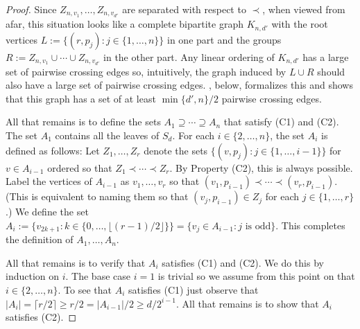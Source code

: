 \documentclass[kpfonts]{patmorin}
\renewcommand{\ge}{\geqslant}
\begin{document}
\begin{proof}
    Since $Z_{n,v_1},\ldots,Z_{n,v_{d'}}$ are separated with respect to $\prec$, when viewed from afar, this situation looks like a complete bipartite graph $K_{n,d'}$ with the root vertices $L:=\{(r,p_j):j\in\{1,\ldots,n\}\}$ in one part and the groups $R:=Z_{n,v_1}\cup\cdots\cup Z_{n,v_{d'}}$ in the other part.  Any linear ordering of $K_{n,d'}$ has a large set of pairwise crossing edges so, intuitively, the graph induced by $L\cup R$ should also have a large set of pairwise crossing edges. , below, formalizes this and shows that this graph has a set of at least $\min\{d',n\}/2$ pairwise crossing edges.

    All that remains is to define the sets $A_1\supseteq\cdots\supseteq A_n$ that satisfy (C1) and (C2).  The set $A_1$ contains all the leaves of $S_d$.  For each $i\in\{2,\ldots,n\}$, the set $A_i$ is defined as follows:  Let $Z_1,\ldots,Z_r$ denote the sets $\{(v,p_j):j\in\{1,\ldots,i-1\}\}$ for $v\in A_{i-1}$ ordered so that $Z_1\prec\cdots\prec Z_r$.  By Property (C2), this is always possible.	Label the vertices of $A_{i-1}$ as $v_1,\ldots,v_r$ so that $(v_1,p_{i-1})\prec\cdots\prec (v_r,p_{i-1})$.   (This is equivalent to naming them so that $(v_j,p_{i-1})\in Z_j$ for each $j\in\{1,\ldots,r\}$.)  We define the set $A_i:=\{v_{2k+1}:k\in\{0,\ldots,\lfloor(r-1)/2\rfloor\}\}=\{v_{j}\in A_{i-1}:\text{$j$ is odd}\}$.  This completes the definition of $A_1,\ldots,A_n$.

	All that remains is to verify that $A_i$ satisfies (C1) and (C2).  We do this by induction on $i$. The base case $i=1$ is trivial so we assume from this point on that $i\in\{2,\ldots,n\}$.   To see that $A_i$ satisfies (C1) just observe that $|A_i|=\lceil r/2\rceil \ge r/2= |A_{i-1}|/2\ge d/2^{i-1}$.  All that remains is to show that $A_i$ satisfies (C2).


\end{proof}
\end{document}
